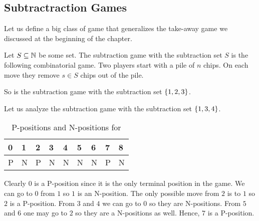 \subsection{Subtractraction Games}
Let us define a big class of game that generalizes the take-away game we
discussed at the beginning of the chapter.
\begin{game}
  Let $S \subseteq {\mathbb{N}}$ be some set. The subtraction game with the subtraction
  set $S$ is the following combinatorial game.
  Two players start with a pile of $n$ chips.
  On each move they remove $s \in S$ chips out of the pile.
\end{game}

So  is the subtraction game with the subtraction
set $\set{1, 2, 3}$.

Let us analyze the subtraction game with the subtraction set $\set{1, 3, 4}$.
\begin{table}[h!]
  \centering
  \begin{tabular}{l l l l l l l l l}
      \toprule
      0 & 1 & 2 & 3 & 4 & 5 & 6 & 7 & 8 \\
      \midrule
      P & N & P & N & N & N & N & P & N \\
      \bottomrule
  \end{tabular}
  \caption{P-positions and N-positions for }
  \label{table:subtraction-4-3-1}
\end{table}
Clearly $0$ is a P-position since it is the only terminal position in the game.
We can go to $0$ from $1$ so $1$ is an N-position. The only possible move from
$2$ is to $1$ so $2$ is a P-position. From $3$ and $4$ we can go to $0$
so they are N-positions. From $5$ and $6$ one may go to $2$ so they are a
N-positions as well. Hence, $7$ is a P-position.

